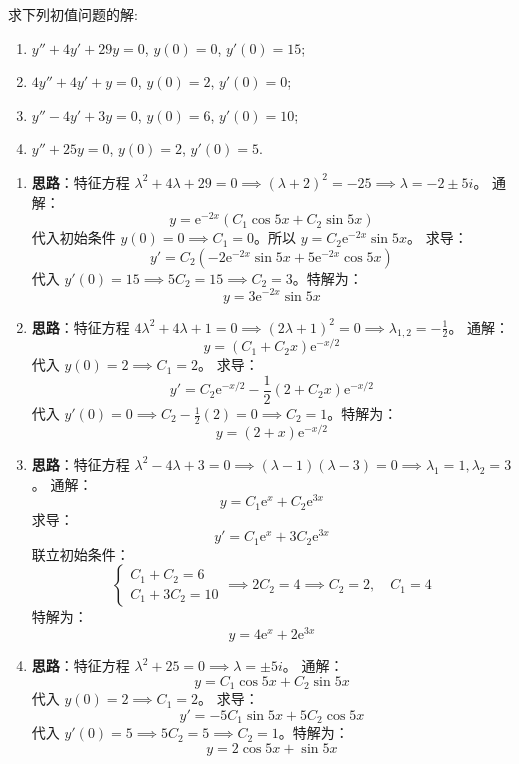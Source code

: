 \documentclass[lang=cn,11pt]{elegantbook}
\begin{document}
\begin{exercise}[齐次方程初值问题]
求下列初值问题的解:
\begin{enumerate}
    \item[(1)] $y''+4y'+29y=0$, $y(0)=0$, $y'(0)=15$;
    \item[(2)] $4y''+4y'+y=0$, $y(0)=2$, $y'(0)=0$;
    \item[(3)] $y''-4y'+3y=0$, $y(0)=6$, $y'(0)=10$;
    \item[(4)] $y''+25y=0$, $y(0)=2$, $y'(0)=5$.
\end{enumerate}
\end{exercise}
\begin{solution}
\begin{enumerate}
    \item[(1)] \textbf{思路}：特征方程 $\lambda^2 + 4\lambda + 29 = 0 \implies (\lambda+2)^2 = -25 \implies \lambda = -2 \pm 5i$。
    通解：
    \[
    y = \mathrm{e}^{-2x}(C_1\cos 5x + C_2\sin 5x)
    \]
    代入初始条件 $y(0) = 0 \implies C_1 = 0$。所以 $y = C_2\mathrm{e}^{-2x}\sin 5x$。
    求导：
    \[
    y' = C_2(-2\mathrm{e}^{-2x}\sin 5x + 5\mathrm{e}^{-2x}\cos 5x)
    \]
    代入 $y'(0) = 15 \implies 5C_2 = 15 \implies C_2 = 3$。特解为：
    \[
    y = 3\mathrm{e}^{-2x}\sin 5x
    \]
    
    \item[(2)] \textbf{思路}：特征方程 $4\lambda^2 + 4\lambda + 1 = 0 \implies (2\lambda+1)^2 = 0 \implies \lambda_{1,2} = -\frac{1}{2}$。
    通解：
    \[
    y = (C_1 + C_2 x)\mathrm{e}^{-x/2}
    \]
    代入 $y(0) = 2 \implies C_1 = 2$。
    求导：
    \[
    y' = C_2\mathrm{e}^{-x/2} - \frac{1}{2}(2 + C_2 x)\mathrm{e}^{-x/2}
    \]
    代入 $y'(0) = 0 \implies C_2 - \frac{1}{2}(2) = 0 \implies C_2 = 1$。特解为：
    \[
    y = (2 + x)\mathrm{e}^{-x/2}
    \]
    
    \item[(3)] \textbf{思路}：特征方程 $\lambda^2 - 4\lambda + 3 = 0 \implies (\lambda-1)(\lambda-3) = 0 \implies \lambda_1 = 1, \lambda_2 = 3$。
    通解：
    \[
    y = C_1\mathrm{e}^x + C_2\mathrm{e}^{3x}
    \]
    求导：
    \[
    y' = C_1\mathrm{e}^x + 3C_2\mathrm{e}^{3x}
    \]
    联立初始条件：
    \[
    \begin{cases}
    C_1 + C_2 = 6 \\
    C_1 + 3C_2 = 10
    \end{cases}
    \implies 2C_2 = 4 \implies C_2 = 2, \quad C_1 = 4
    \]
    特解为：
    \[
    y = 4\mathrm{e}^x + 2\mathrm{e}^{3x}
    \]
    
    \item[(4)] \textbf{思路}：特征方程 $\lambda^2 + 25 = 0 \implies \lambda = \pm 5i$。
    通解：
    \[
    y = C_1\cos 5x + C_2\sin 5x
    \]
    代入 $y(0) = 2 \implies C_1 = 2$。
    求导：
    \[
    y' = -5C_1\sin 5x + 5C_2\cos 5x
    \]
    代入 $y'(0) = 5 \implies 5C_2 = 5 \implies C_2 = 1$。特解为：
    \[
    y = 2\cos 5x + \sin 5x
    \]
\end{enumerate}
\end{solution}
\end{document}
